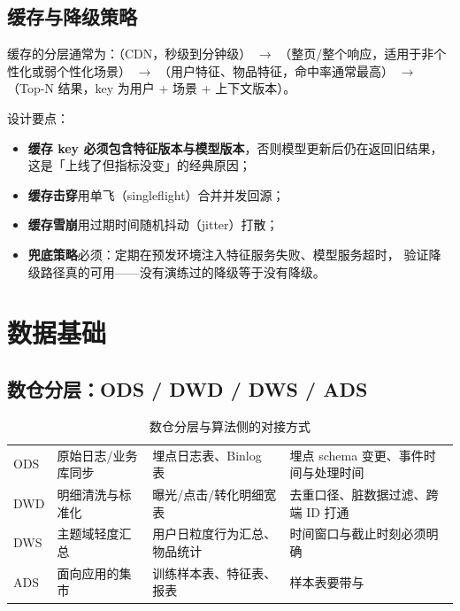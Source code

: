 \subsection{缓存与降级策略}

缓存的分层通常为：（CDN，秒级到分钟级）
$\to$ （整页/整个响应，适用于非个性化或弱个性化场景）
$\to$ （用户特征、物品特征，命中率通常最高）
$\to$ （Top-N 结果，key 为用户 + 场景 + 上下文版本）。

设计要点：
\begin{itemize}
  \item \textbf{缓存 key 必须包含特征版本与模型版本}，否则模型更新后仍在返回旧结果，
        这是「上线了但指标没变」的经典原因；
  \item \textbf{缓存击穿}用单飞（singleflight）合并并发回源；
  \item \textbf{缓存雪崩}用过期时间随机抖动（jitter）打散；
  \item \textbf{兜底策略}必须：定期在预发环境注入特征服务失败、模型服务超时，
        验证降级路径真的可用——没有演练过的降级等于没有降级。
\end{itemize}

\section{数据基础}

\subsection{数仓分层：ODS / DWD / DWS / ADS}

\begin{table}[htbp]
\centering
\caption{数仓分层与算法侧的对接方式}
\label{tab:warehouse}
\small
\begin{tabularx}{\textwidth}{L{1.8cm} L{2.6cm} L{3.0cm} Y}
\toprule
{} &  &  &  \\
\midrule
ODS & 原始日志/业务库同步 & 埋点日志表、Binlog 表 & 埋点 schema 变更、事件时间与处理时间 \\
\addlinespace
DWD & 明细清洗与标准化 & 曝光/点击/转化明细宽表 & 去重口径、脏数据过滤、跨端 ID 打通 \\
\addlinespace
DWS & 主题域轻度汇总 & 用户日粒度行为汇总、物品统计 & 时间窗口与截止时刻必须明确 \\
\addlinespace
ADS & 面向应用的集市 & 训练样本表、特征表、报表 & 样本表要带与 \\
\bottomrule
\end{tabularx}
\end{table}

